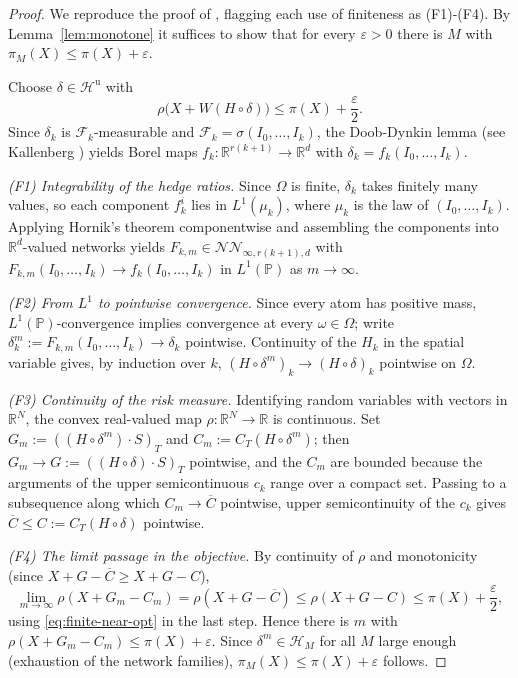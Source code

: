 \documentclass[11pt,a4paper]{report}
\numberwithin{equation}{chapter}
\theoremstyle{plain}
\theoremstyle{definition}
\newcommand{\PP}{\mathbb{P}}
\newcommand{\R}{\mathbb{R}}
\newcommand{\F}{\mathcal{F}}
\newcommand{\HH}{\mathcal{H}}
\newcommand{\Hu}{\mathcal{H}^{\mathrm{u}}}
\newcommand{\NNet}{\mathcal{N\!N}}
\begin{document}
\begin{proof}
    We reproduce the proof of \cite[Proposition~4.3]{buehler}, flagging each use of finiteness as (F1)-(F4). By Lemma~\ref{lem:monotone} it suffices to show that for every $\varepsilon>0$ there is $M$ with $\pi_M(X)\le\pi(X)+\varepsilon$.

    Choose $\delta\in\Hu$ with
    \begin{equation}\label{eq:finite-near-opt}
        \rho\bigl(X+W(H\circ\delta)\bigr)\le\pi(X)+\frac{\varepsilon}{2}.
    \end{equation}
    Since $\delta_k$ is $\F_k$-measurable and $\F_k=\sigma(I_0,\dots,I_k)$, the Doob-Dynkin lemma (see Kallenberg \cite[Lemma~1.13]{kallenberg}) yields Borel maps $f_k\colon\R^{r(k+1)}\to\R^d$ with $\delta_k=f_k(I_0,\dots,I_k)$.

    \emph{(F1) Integrability of the hedge ratios.} Since $\Omega$ is finite, $\delta_k$ takes finitely many values, so each component $f_k^i$ lies in $L^1(\mu_k)$, where $\mu_k$ is the law of $(I_0,\dots,I_k)$. Applying Hornik's theorem componentwise and assembling the components into $\R^d$-valued networks yields $F_{k,m}\in\NNet_{\infty,r(k+1),d}$ with $F_{k,m}(I_0,\dots,I_k)\to f_k(I_0,\dots,I_k)$ in $L^1(\PP)$ as $m\to\infty$.

    \emph{(F2) From $L^1$ to pointwise convergence.} Since every atom has positive mass, $L^1(\PP)$-convergence implies convergence at every $\omega\in\Omega$; write $\delta^m_k:=F_{k,m}(I_0,\dots,I_k)\to\delta_k$ pointwise. Continuity of the $H_k$ in the spatial variable gives, by induction over $k$, $(H\circ\delta^m)_k\to(H\circ\delta)_k$ pointwise on $\Omega$.

    \emph{(F3) Continuity of the risk measure.} Identifying random variables with vectors in $\R^N$, the convex real-valued map $\rho\colon\R^N\to\R$ is continuous. Set $G_m:=((H\circ\delta^m)\cdot S)_T$ and $C_m:=C_T(H\circ\delta^m)$; then $G_m\to G:=((H\circ\delta)\cdot S)_T$ pointwise, and the $C_m$ are bounded because the arguments of the upper semicontinuous $c_k$ range over a compact set. Passing to a subsequence along which $C_m\to\overline C$ pointwise, upper semicontinuity of the $c_k$ gives $\overline C\le C:=C_T(H\circ\delta)$ pointwise.

    \emph{(F4) The limit passage in the objective.} By continuity of $\rho$ and monotonicity (since $X+G-\overline C\ge X+G-C$),
    \[
        \lim_{m\to\infty}\rho(X+G_m-C_m)=\rho(X+G-\overline C)\le\rho(X+G-C)\le\pi(X)+\frac{\varepsilon}{2},
    \]
    using \eqref{eq:finite-near-opt} in the last step. Hence there is $m$ with $\rho(X+G_m-C_m)\le\pi(X)+\varepsilon$. Since $\delta^m\in\HH_M$ for all $M$ large enough (exhaustion of the network families), $\pi_M(X)\le\pi(X)+\varepsilon$ follows.
\end{proof}
\end{document}
